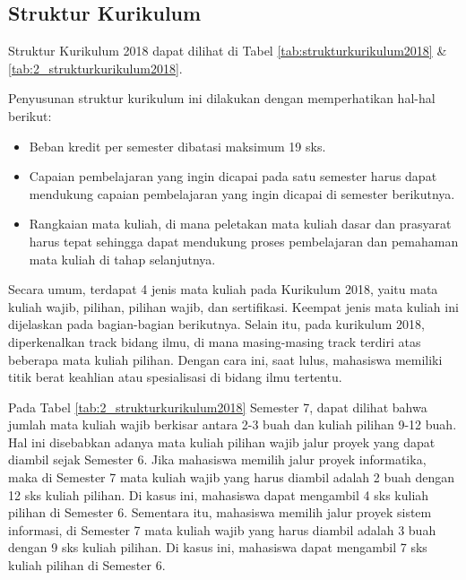 \subsection{Struktur Kurikulum}

Struktur Kurikulum 2018 dapat dilihat di Tabel \ref{tab:strukturkurikulum2018} \& \ref{tab:2_strukturkurikulum2018}.

Penyusunan struktur kurikulum ini dilakukan dengan memperhatikan hal-hal berikut:
\begin{itemize}
	\item Beban kredit per semester dibatasi maksimum 19 sks.
	\item Capaian pembelajaran yang ingin dicapai pada satu semester harus dapat mendukung capaian pembelajaran yang ingin dicapai di semester berikutnya.
	\item Rangkaian mata kuliah, di mana peletakan mata kuliah dasar dan prasyarat harus tepat sehingga dapat mendukung proses pembelajaran dan pemahaman mata kuliah di tahap selanjutnya. 
\end{itemize}
Secara umum, terdapat 4 jenis mata kuliah pada Kurikulum 2018, yaitu mata kuliah wajib, pilihan, pilihan wajib, dan sertifikasi. Keempat jenis mata kuliah ini dijelaskan pada bagian-bagian berikutnya. Selain itu, pada kurikulum 2018, diperkenalkan track bidang ilmu, di mana masing-masing track terdiri atas beberapa mata kuliah pilihan. Dengan cara ini, saat lulus, mahasiswa memiliki titik berat keahlian atau spesialisasi di bidang ilmu tertentu.

Pada Tabel \ref{tab:2_strukturkurikulum2018} Semester 7, dapat dilihat bahwa jumlah mata kuliah wajib berkisar antara 2-3 buah dan kuliah pilihan 9-12 buah. Hal ini disebabkan adanya mata kuliah pilihan wajib jalur proyek yang dapat diambil sejak Semester 6. Jika mahasiswa memilih jalur proyek informatika, maka di Semester 7 mata kuliah wajib yang harus diambil adalah 2 buah dengan 12 sks kuliah pilihan. Di kasus ini, mahasiswa dapat mengambil 4 sks kuliah pilihan di Semester 6. Sementara itu, mahasiswa memilih jalur proyek sistem informasi, di Semester 7 mata kuliah wajib yang harus diambil adalah 3 buah dengan 9 sks kuliah pilihan. Di kasus ini, mahasiswa dapat mengambil 7 sks kuliah pilihan di Semester 6.

